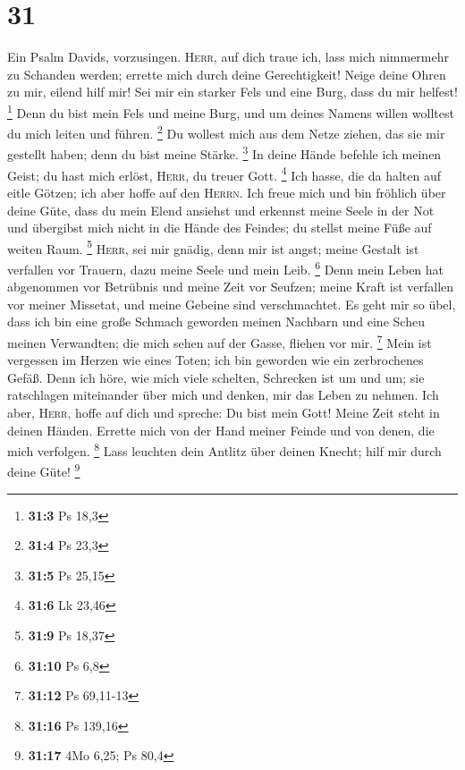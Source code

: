 \hypertarget{section-15}{%
\section{31}\label{section-15}}

 Ein Psalm Davids, vorzusingen. 
\textsc{Herr}, auf dich traue ich, lass mich nimmermehr zu Schanden
werden; errette mich durch deine Gerechtigkeit!  Neige
deine Ohren zu mir, eilend hilf mir! Sei mir ein starker Fels und eine
Burg, dass du mir helfest! \footnote{\textbf{31:3} Ps 18,3}
 Denn du bist mein Fels und meine Burg, und um deines
Namens willen wolltest du mich leiten und führen. \footnote{\textbf{31:4}
  Ps 23,3}  Du wollest mich aus dem Netze ziehen, das sie
mir gestellt haben; denn du bist meine Stärke. \footnote{\textbf{31:5}
  Ps 25,15}  In deine Hände befehle ich meinen Geist; du
hast mich erlöst, \textsc{Herr}, du treuer Gott. \footnote{\textbf{31:6}
  Lk 23,46}  Ich hasse, die da halten auf eitle Götzen;
ich aber hoffe auf den \textsc{Herrn}.  Ich freue mich und
bin fröhlich über deine Güte, dass du mein Elend ansiehst und erkennst
meine Seele in der Not  und übergibst mich nicht in die
Hände des Feindes; du stellst meine Füße auf weiten Raum. \footnote{\textbf{31:9}
  Ps 18,37}  \textsc{Herr}, sei mir gnädig, denn mir ist
angst; meine Gestalt ist verfallen vor Trauern, dazu meine Seele und
mein Leib. \footnote{\textbf{31:10} Ps 6,8}  Denn mein
Leben hat abgenommen vor Betrübnis und meine Zeit vor Seufzen; meine
Kraft ist verfallen vor meiner Missetat, und meine Gebeine sind
verschmachtet.  Es geht mir so übel, dass ich bin eine
große Schmach geworden meinen Nachbarn und eine Scheu meinen Verwandten;
die mich sehen auf der Gasse, fliehen vor mir. \footnote{\textbf{31:12}
  Ps 69,11-13}  Mein ist vergessen im Herzen wie eines
Toten; ich bin geworden wie ein zerbrochenes Gefäß.  Denn
ich höre, wie mich viele schelten, Schrecken ist um und um; sie
ratschlagen miteinander über mich und denken, mir das Leben zu nehmen.
 Ich aber, \textsc{Herr}, hoffe auf dich und spreche: Du
bist mein Gott!  Meine Zeit steht in deinen Händen.
Errette mich von der Hand meiner Feinde und von denen, die mich
verfolgen. \footnote{\textbf{31:16} Ps 139,16}  Lass
leuchten dein Antlitz über deinen Knecht; hilf mir durch deine Güte!
\footnote{\textbf{31:17} 4Mo 6,25; Ps 80,4} 
